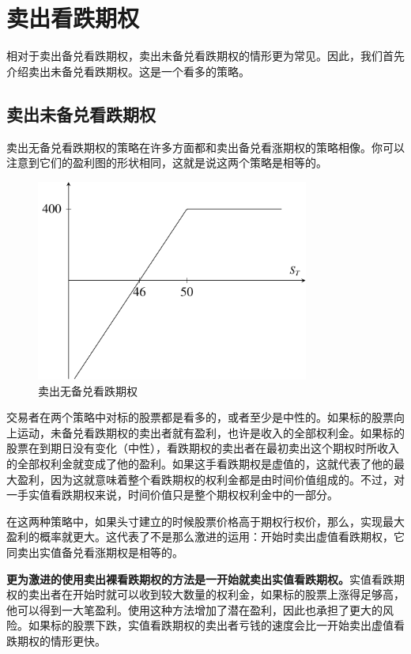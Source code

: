 \chapter{卖出看跌期权\label{CH19}}
相对于卖出备兑看跌期权，卖出未备兑看跌期权的情形更为常见。因此，我们首先介绍卖出未备兑看跌期权。这是一个看多的策略。
\section{卖出未备兑看跌期权}
卖出无备兑看跌期权的策略在许多方面都和卖出备兑看涨期权的策略相像。你可以注意到它们的盈利图的形状相同，这就是说这两个策略是相等的。

\begin{figure}
    \centering
    \includegraphics[width=0.8\textwidth]{IMG/Uncovered sale of a put.pdf}
    \caption{卖出无备兑看跌期权}
    \label{fig:uncovered put short}
\end{figure}

交易者在两个策略中对标的股票都是看多的，或者至少是中性的。如果标的股票向上运动，未备兑看跌期权的卖出者就有盈利，也许是收入的全部权利金。如果标的股票在到期日没有变化（中性），看跌期权的卖出者在最初卖出这个期权时所收入的全部权利金就变成了他的盈利。如果这手看跌期权是虚值的，这就代表了他的最大盈利，因为这就意味着整个看跌期权的权利金都是由时间价值组成的。不过，对一手实值看跌期权来说，时间价值只是整个期权权利金中的一部分。

在这两种策略中，如果头寸建立的时候股票价格高于期权行权价，那么，实现最大盈利的概率就更大。这代表了不是那么激进的运用：开始时卖出虚值看跌期权，它同卖出实值备兑看涨期权是相等的。

\textbf{更为激进的使用卖出裸看跌期权的方法是一开始就卖出实值看跌期权。}实值看跌期权的卖出者在开始时就可以收到较大数量的权利金，如果标的股票上涨得足够高，他可以得到一大笔盈利。使用这种方法增加了潜在盈利，因此也承担了更大的风险。如果标的股票下跌，实值看跌期权的卖出者亏钱的速度会比一开始卖出虚值看跌期权的情形更快。

